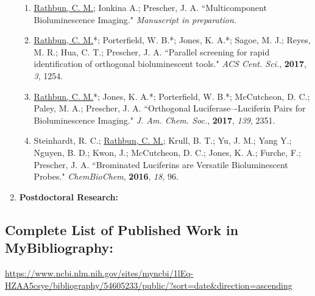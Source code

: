 \documentclass{nihbiosketch}
\begin{document}
\begin{enumerate}
\begin{enumerate}

  \item \underline{Rathbun, C. M.}; Ionkina A.; Prescher, J. A. ``Multicomponent Bioluminescence Imaging."  \textit{Manuscript in preparation.}

  \item \underline{Rathbun, C. M.}*; Porterfield, W. B.*; Jones, K. A.*; Sagoe, M. J.; Reyes, M. R.; Hua, C. T.; Prescher, J. A. ``Parallel screening for rapid identification of orthogonal bioluminescent tools." \textit{ACS Cent. Sci.}, \textbf{2017}, \textit{3}, 1254.


  \item \underline{Rathbun, C. M.}*; Jones, K. A.*; Porterfield, W. B.*; McCutcheon, D. C.; Paley, M. A.; Prescher, J. A. ``Orthogonal Luciferase–-Luciferin Pairs for Bioluminescence Imaging." \textit{J. Am. Chem. Soc.}, \textbf{2017}, \textit{139}, 2351.

  \item Steinhardt, R. C.; \underline{Rathbun, C. M.}; Krull, B. T.; Yu, J. M.; Yang Y.; Nguyen, B. D.; Kwon, J.; McCutcheon, D. C.; Jones, K. A.; Furche, F.; Prescher, J. A. ``Brominated Luciferins are Versatile Bioluminescent Probes." \textit{ChemBioChem}, \textbf{2016}, \textit{18}, 96.

\end{enumerate}

\item \textbf{Postdoctoral Research:} %

\end{enumerate}

\subsection*{Complete List of Published Work in MyBibliography:}
\url{https://www.ncbi.nlm.nih.gov/sites/myncbi/1lEq-HZAA5csye/bibliography/54605233/public/?sort=date&direction=ascending}


\end{document}
